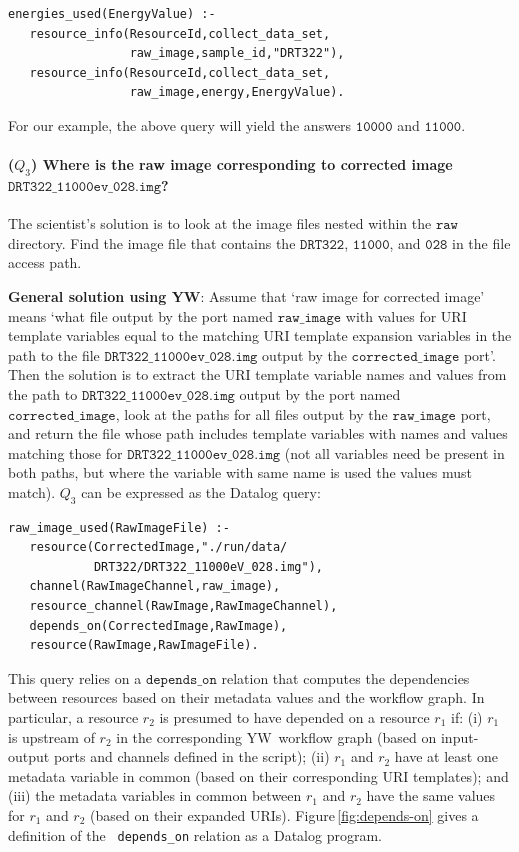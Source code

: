 \documentclass[nocopyrightspace]{sigplanconf}
\newcommand{\Figref}[1]{Figure\,\ref{#1}}
\newcommand{\code}[1]{\ensuremath{\mathtt{#1}}}
\newcommand{\yw}{\textsf{YW}}
\begin{document}
\begin{small}
\begin{verbatim}
energies_used(EnergyValue) :-
   resource_info(ResourceId,collect_data_set,
                 raw_image,sample_id,"DRT322"),
   resource_info(ResourceId,collect_data_set,
                 raw_image,energy,EnergyValue).
\end{verbatim}
\end{small}
For our example, the above query will yield the answers \code{10000}
and \code{11000}.

\paragraph{($Q_3$)
  Where is the raw image corresponding to corrected image
  \code{DRT322\_11000ev\_028.img}?}
The scientist's solution is to look at the image files nested within
the \code{raw} directory.  Find the image file that contains the
\code{DRT322}, \code{11000}, and \code{028} in the file access
path.

\textbf{General solution using \yw}: Assume that `raw image for
corrected image' means `what file output by the port named
\code{raw\_image} with values for URI template variables equal to the
matching URI template expansion variables in the path to the file
\code{DRT322\_11000ev\_028.img} output by the \code {corrected\_image}
port'.  Then the solution is to extract the URI template variable
names and values from the path to \code{DRT322\_11000ev\_028.img}
output by the port named \code{corrected\_image}, look at the paths
for all files output by the \code{raw\_image} port, and return the
file whose path includes template variables with names and values
matching those for \code{DRT322\_11000ev\_028.img} (not all variables
need be present in both paths, but where the variable with same name
is used the values must match).  $Q_3$ can be expressed as the Datalog
query:

\begin{small}
\begin{verbatim}
raw_image_used(RawImageFile) :-
   resource(CorrectedImage,"./run/data/
            DRT322/DRT322_11000eV_028.img"),
   channel(RawImageChannel,raw_image),
   resource_channel(RawImage,RawImageChannel),
   depends_on(CorrectedImage,RawImage),
   resource(RawImage,RawImageFile).
\end{verbatim}
\end{small}
This query relies on a \code{depends\_on} relation that computes the
dependencies between resources based on their metadata values and the
workflow graph. In particular, a resource $r_2$ is presumed to have
depended on a resource $r_1$ if: (i) $r_1$ is upstream of $r_2$ in the
corresponding \yw\ workflow graph (based on input-output ports and
channels defined in the script); (ii) $r_1$ and $r_2$ have at least
one metadata variable in common (based on their corresponding URI
templates); and (iii) the metadata variables in common between $r_1$
and $r_2$ have the same values for $r_1$ and $r_2$ (based on their
expanded URIs). \Figref{fig:depends-on} gives a definition of the {\tt
  depends\_on} relation as a Datalog program.
\end{document}

